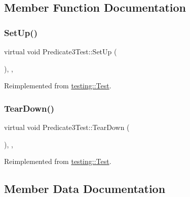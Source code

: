 \subsection{Member Function Documentation}
\mbox{\label{classPredicate3Test_a92aad9566e0737b6739d1db14e7912be}} 
\subsubsection{\texorpdfstring{SetUp()}{SetUp()}}
{\footnotesize\ttfamily virtual void Predicate3\+Test\+::\+Set\+Up (\begin{DoxyParamCaption}{ }\end{DoxyParamCaption})\hspace{0.3cm}{\ttfamily [inline]}, {\ttfamily [protected]}, {\ttfamily [virtual]}}



Reimplemented from \mbox{\hyperlink{classtesting_1_1Test_a190315150c303ddf801313fd1a777733}{testing\+::\+Test}}.

\mbox{\label{classPredicate3Test_aa4dc395bded849b6e5175566d791aba7}} 
\subsubsection{\texorpdfstring{TearDown()}{TearDown()}}
{\footnotesize\ttfamily virtual void Predicate3\+Test\+::\+Tear\+Down (\begin{DoxyParamCaption}{ }\end{DoxyParamCaption})\hspace{0.3cm}{\ttfamily [inline]}, {\ttfamily [protected]}, {\ttfamily [virtual]}}



Reimplemented from \mbox{\hyperlink{classtesting_1_1Test_a5f0ab439802cbe0ef7552f1a9f791923}{testing\+::\+Test}}.



\subsection{Member Data Documentation}
\mbox{\label{classPredicate3Test_a42c11555410ee89bf6e59d39336a212c}} 
